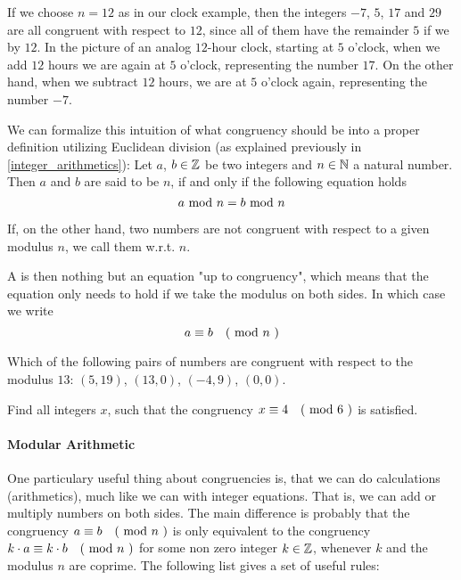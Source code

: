 \begin{example}
If we choose $n=12$ as in our clock example, then the integers $-7$, $5$, $17$ and $29$ are all congruent with respect to $12$, since all of them have the remainder $5$ if we  by $12$. In the picture of an analog $12$-hour clock, starting at $5$ o'clock, when we add $12$ hours we are again at $5$ o'clock, representing the number $17$. On the other hand, when we subtract $12$ hours, we are at $5$ o'clock again, representing the number $-7$. 
\end{example}
We can formalize this intuition of what congruency should be into a proper definition utilizing Euclidean division (as explained previously in \ref{integer_arithmetics}): Let $ a $, $ b \in \mathbb{Z} $ be two integers and $ n \in \mathbb{N} $ a natural number.
Then $ a $ and $ b $ are said to be  $ n $, if and only if the following equation holds
\begin{equation}
a \text{ mod } n = b \text{ mod } n
\end{equation}

If, on the other hand, two numbers are not congruent with respect to a given modulus $n$, we call them  w.r.t. $n$. 

A  is then nothing but an equation "up to congruency", which means that the equation only needs to hold if we take the modulus on both sides. In which case we write 
\begin{equation}
a \equiv b \quad \text{( mod } n \text{ )} 
\end{equation}
\begin{exercise}
Which of the following pairs of numbers are congruent with respect to the modulus $13$: 
$(5,19)$, $(13,0)$, $(-4,9)$, $(0,0)$.
\end{exercise}
\begin{exercise}
Find all integers $x$, such that the congruency $x \equiv 4 \quad \text{( mod } 6 \text{ )}$ is satisfied.
\end{exercise}
\paragraph{Modular Arithmetic}
One particulary useful thing about congruencies is, that we can do calculations (arithmetics), much like we can with integer equations. That is, we can add or multiply numbers on both sides. The main difference is probably that the congruency $a \equiv b \quad \text{( mod } n \text{ )}$ is only equivalent to the congruency $k\cdot a \equiv k\cdot b \quad \text{( mod } n \text{ )}$ for some non zero integer $k\in \mathbb{Z}$, whenever $k$ and the modulus $n$ are coprime. The following list gives a set of useful rules:

